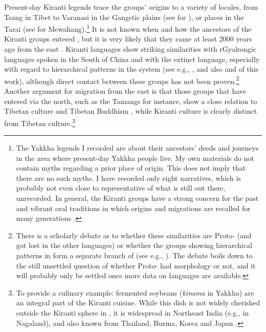Present-day Kiranti legends trace the groups' origins to a variety of locales, from Tsang in Tibet to Varanasi in the Gangetic plains (see \citealt[xix]{Driem1987A-grammar} for ), or places in the Tarai (see \citealt[34]{Gaenszle2012_Where} for Mewahang).\footnote{The Yakkha legends I recorded are about their ancestors' deeds and journeys in the area where present-day Yakkha people live. My own materials do not contain myths regarding a prior place of origin. This does not imply that there are no such myths. I have recorded only eight narratives, which is probably not even close to representative of what is still out there, unrecorded. In general, the Kiranti groups have a strong concern for the past and vibrant oral traditions in which origins and migrations are recalled for many generations \citep{Gaenszle2000Origins, Gaenszle2002_Remaking}.} It is not known when and how the ancestors of the Kiranti groups entered , but it is very likely that they came at least 2000 years ago from the east \citep{Driem2001Languages, LaPolla2001_Role, Gaenszle2002_Remaking}. Kiranti languages show striking similarities with rGyalrongic languages spoken in the South of China and with the extinct  language, especially with regard to hierarchical patterns in the  system (see e.g., \citet{DeLancey1981_Category, Ebert1990Evidence, LaPolla2007Hierarchical, Jacques2012_Agreement}, and also  and  of this work), although direct contact between these  groups has not been proven.\footnote{There is a scholarly debate as to whether these similarities are Proto- (and got lost in the other languages) or whether the groups showing hierarchical patterns in  form a separate branch of  (see e.g., \citealt{Driem1991Tangut, LaPolla2001_Role, DeLancey2010_Towards, Jacques2012_Agreement, LaPolla2012_Comments}). The debate boils down to the still unsettled question of whether Proto- had  morphology or not, and it will probably only be settled once more data on  languages are available.} Another argument for  migration from the east is that those  groups that have entered  via the north, such as the Tamangs for instance, show a close relation to Tibetan culture and Tibetan Buddhism \citep{LaPolla2001_Role}, while Kiranti culture is clearly distinct from Tibetan culture.\footnote{To provide a culinary example: fermented soybeans (\emph{kinama} in Yakkha) are an integral part of the Kiranti cuisine. While this dish is not widely cherished outside the Kiranti sphere in , it is widespread in Northeast India (e.g., in Nagaland), and  also known from Thailand, Burma, Korea and Japan \citep{Tamang2010_fermented}.} 
 
